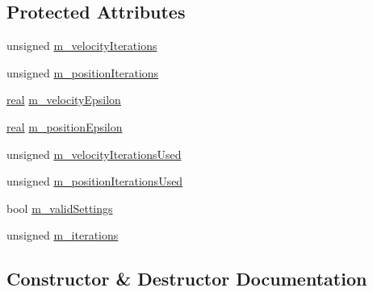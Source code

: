 \subsection*{Protected Attributes}
\begin{DoxyCompactItemize}
\item 
unsigned \mbox{\hyperlink{classr3_1_1_contact_resolver_a5ebf50739d29cfd44c839f0949653f56}{m\+\_\+velocity\+Iterations}}
\item 
unsigned \mbox{\hyperlink{classr3_1_1_contact_resolver_a53bef5ef42c6f5d643b30888f517332d}{m\+\_\+position\+Iterations}}
\item 
\mbox{\hyperlink{namespacer3_ab2016b3e3f743fb735afce242f0dc1eb}{real}} \mbox{\hyperlink{classr3_1_1_contact_resolver_ae3aeb6defa615dfc0be6b0e9a79b1964}{m\+\_\+velocity\+Epsilon}}
\item 
\mbox{\hyperlink{namespacer3_ab2016b3e3f743fb735afce242f0dc1eb}{real}} \mbox{\hyperlink{classr3_1_1_contact_resolver_aea34f9f1d5131d0949878375e8eefff6}{m\+\_\+position\+Epsilon}}
\item 
unsigned \mbox{\hyperlink{classr3_1_1_contact_resolver_a1d02afed1bbae067eee7792fcb859278}{m\+\_\+velocity\+Iterations\+Used}}
\item 
unsigned \mbox{\hyperlink{classr3_1_1_contact_resolver_a4e790314254412d28d2063b1e0f26e4b}{m\+\_\+position\+Iterations\+Used}}
\item 
bool \mbox{\hyperlink{classr3_1_1_contact_resolver_a3015ece0b9280101a65abcc2b2b4c85f}{m\+\_\+valid\+Settings}}
\item 
unsigned \mbox{\hyperlink{classr3_1_1_contact_resolver_add8b2f230c8ed5ef56639dec4f111a44}{m\+\_\+iterations}}
\end{DoxyCompactItemize}


\subsection{Constructor \& Destructor Documentation}
\mbox{\label{classr3_1_1_contact_resolver_a1728aa5f4a167b00b0c138f6aacf3206}} 
